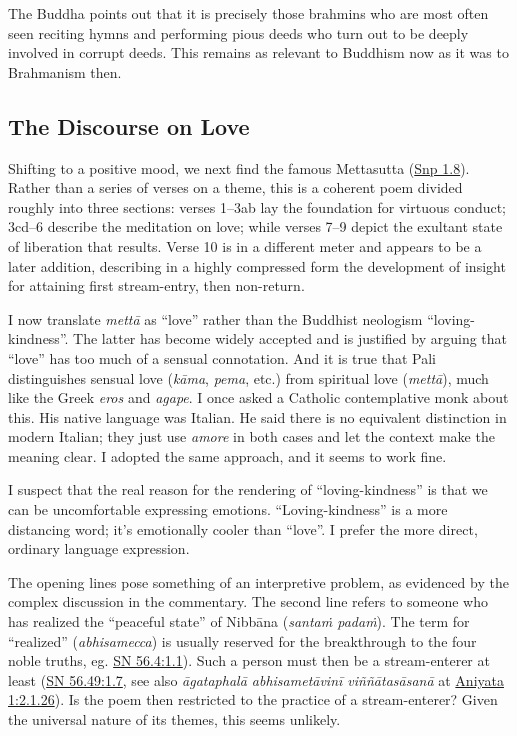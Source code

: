 \documentclass[12pt,openany]{book}%
\begin{document}
The Buddha points out that it is precisely those brahmins who are most often seen reciting hymns and performing pious deeds who turn out to be deeply involved in corrupt deeds. This remains as relevant to Buddhism now as it was to Brahmanism then.

\subsection*{The Discourse on Love}

Shifting to a positive mood, we next find the famous Mettasutta (\href{https://suttacentral.net/snp1.8/en/sujato}{Snp 1.8}). Rather than a series of verses on a theme, this is a coherent poem divided roughly into three sections: verses 1–3ab lay the foundation for virtuous conduct; 3cd–6 describe the meditation on love; while verses 7–9 depict the exultant state of liberation that results. Verse 10 is in a different meter and appears to be a later addition, describing in a highly compressed form the development of insight for attaining first stream-entry, then non-return.

I now translate \textit{\textsanskrit{mettā}} as “love” rather than the Buddhist neologism “loving-kindness”. The latter has become widely accepted and is justified by arguing that “love” has too much of a sensual connotation. And it is true that Pali distinguishes sensual love (\textit{\textsanskrit{kāma}}, \textit{pema}, etc.) from spiritual love (\textit{\textsanskrit{mettā}}), much like the Greek \emph{eros} and \emph{agape}. I once asked a Catholic contemplative monk about this. His native language was Italian. He said there is no equivalent distinction in modern Italian; they just use \emph{amore} in both cases and let the context make the meaning clear. I adopted the same approach, and it seems to work fine.

I suspect that the real reason for the rendering of “loving-kindness” is that we can be uncomfortable expressing emotions. “Loving-kindness” is a more distancing word; it’s emotionally cooler than “love”. I prefer the more direct, ordinary language expression.

The opening lines pose something of an interpretive problem, as evidenced by the complex discussion in the commentary. The second line refers to someone who has realized the “peaceful state” of \textsanskrit{Nibbāna} (\textit{\textsanskrit{santaṁ} \textsanskrit{padaṁ}}). The term for “realized” (\textit{abhisamecca}) is usually reserved for the breakthrough to the four noble truths, eg. \href{https://suttacentral.net/sn56.4/en/sujato\#1.1}{SN 56.4:1.1}). Such a person must then be a stream-enterer at least (\href{https://suttacentral.net/sn56.49/en/sujato\#1.7}{SN 56.49:1.7}, see also \textit{\textsanskrit{āgataphalā} \textsanskrit{abhisametāvinī} \textsanskrit{viññātasāsanā}} at \href{https://suttacentral.net/pli-tv-bu-vb-ay1/en/brahmali\#2.1.26}{Aniyata 1:2.1.26}). Is the poem then restricted to the practice of a stream-enterer? Given the universal nature of its themes, this seems unlikely.
\end{document}
